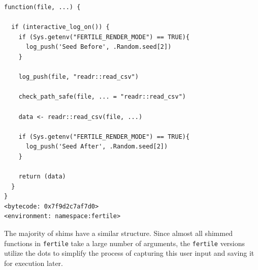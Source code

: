 \documentclass[12pt,twoside]{reedthesis}
\begin{document}
\begin{verbatim}
function(file, ...) {

  if (interactive_log_on()) {
    if (Sys.getenv("FERTILE_RENDER_MODE") == TRUE){
      log_push('Seed Before', .Random.seed[2])
    }

    log_push(file, "readr::read_csv")

    check_path_safe(file, ... = "readr::read_csv")

    data <- readr::read_csv(file, ...)

    if (Sys.getenv("FERTILE_RENDER_MODE") == TRUE){
      log_push('Seed After', .Random.seed[2])
    }

    return (data)
  }
}
<bytecode: 0x7f9d2c7af7d0>
<environment: namespace:fertile>
\end{verbatim}
The majority of shims have a similar structure. Since almost all shimmed
functions in \texttt{fertile} take a large number of arguments, the
\texttt{fertile} versions utilize the dots to simplify the process of
capturing this user input and saving it for execution later.
\end{document}
